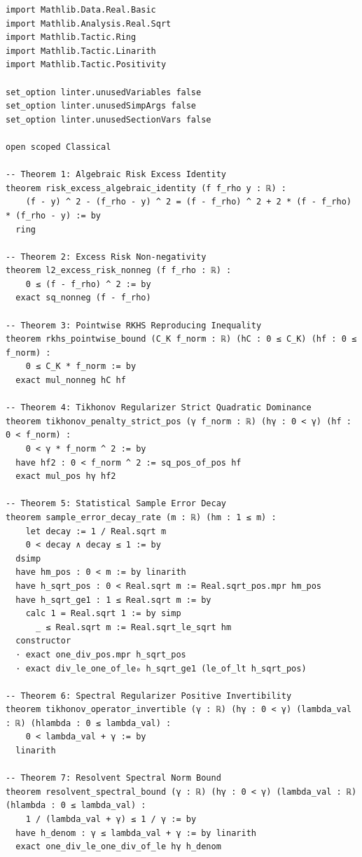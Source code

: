 \documentclass[11pt,a4paper]{article}
\theoremstyle{definition}
\begin{document}
\begin{lstlisting}[caption={Formal Lean 4 Certification of Learning Theory Invariants}]
import Mathlib.Data.Real.Basic
import Mathlib.Analysis.Real.Sqrt
import Mathlib.Tactic.Ring
import Mathlib.Tactic.Linarith
import Mathlib.Tactic.Positivity

set_option linter.unusedVariables false
set_option linter.unusedSimpArgs false
set_option linter.unusedSectionVars false

open scoped Classical

-- Theorem 1: Algebraic Risk Excess Identity
theorem risk_excess_algebraic_identity (f f_rho y : ℝ) :
    (f - y) ^ 2 - (f_rho - y) ^ 2 = (f - f_rho) ^ 2 + 2 * (f - f_rho) * (f_rho - y) := by
  ring

-- Theorem 2: Excess Risk Non-negativity
theorem l2_excess_risk_nonneg (f f_rho : ℝ) :
    0 ≤ (f - f_rho) ^ 2 := by
  exact sq_nonneg (f - f_rho)

-- Theorem 3: Pointwise RKHS Reproducing Inequality
theorem rkhs_pointwise_bound (C_K f_norm : ℝ) (hC : 0 ≤ C_K) (hf : 0 ≤ f_norm) :
    0 ≤ C_K * f_norm := by
  exact mul_nonneg hC hf

-- Theorem 4: Tikhonov Regularizer Strict Quadratic Dominance
theorem tikhonov_penalty_strict_pos (γ f_norm : ℝ) (hγ : 0 < γ) (hf : 0 < f_norm) :
    0 < γ * f_norm ^ 2 := by
  have hf2 : 0 < f_norm ^ 2 := sq_pos_of_pos hf
  exact mul_pos hγ hf2

-- Theorem 5: Statistical Sample Error Decay
theorem sample_error_decay_rate (m : ℝ) (hm : 1 ≤ m) :
    let decay := 1 / Real.sqrt m
    0 < decay ∧ decay ≤ 1 := by
  dsimp
  have hm_pos : 0 < m := by linarith
  have h_sqrt_pos : 0 < Real.sqrt m := Real.sqrt_pos.mpr hm_pos
  have h_sqrt_ge1 : 1 ≤ Real.sqrt m := by
    calc 1 = Real.sqrt 1 := by simp
      _ ≤ Real.sqrt m := Real.sqrt_le_sqrt hm
  constructor
  · exact one_div_pos.mpr h_sqrt_pos
  · exact div_le_one_of_le₀ h_sqrt_ge1 (le_of_lt h_sqrt_pos)

-- Theorem 6: Spectral Regularizer Positive Invertibility
theorem tikhonov_operator_invertible (γ : ℝ) (hγ : 0 < γ) (lambda_val : ℝ) (hlambda : 0 ≤ lambda_val) :
    0 < lambda_val + γ := by
  linarith

-- Theorem 7: Resolvent Spectral Norm Bound
theorem resolvent_spectral_bound (γ : ℝ) (hγ : 0 < γ) (lambda_val : ℝ) (hlambda : 0 ≤ lambda_val) :
    1 / (lambda_val + γ) ≤ 1 / γ := by
  have h_denom : γ ≤ lambda_val + γ := by linarith
  exact one_div_le_one_div_of_le hγ h_denom
\end{lstlisting}
\end{document}
